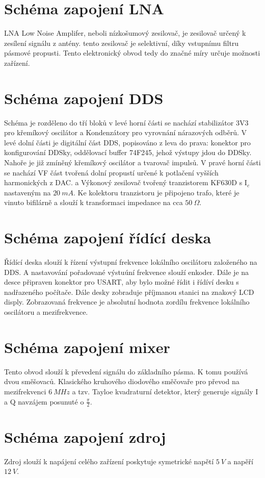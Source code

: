 \section{Schéma zapojení LNA}
	LNA Low Noise Amplifer, neboli nízkošumový zesilovač, je zesilovač určený k zesílení signálu z antény. tento zesilovač je selektivní, díky vstupnímu filtru pásmové propusti. Tento elektronický obvod tedy do značné míry určuje možnosti zařízení.
	
	
\section{Schéma zapojení DDS}
	Schéma je rozděleno do tří bloků v levé horní části se nachází stabilizátor 3V3 pro křemíkový oscilátor a Kondenzátory pro vyrovnání nárazových odběrů. V levé dolní části je digitální část DDS, popisováno z leva do prava: konektor pro konfigurování DDSky, oddělovací buffer 74F245, jehož výstupy jdou do DDSky. Nahoře je již zmíněný křemíkový oscilátor a tvarovač impulsů. V pravé horní části se nachází VF část tvořená dolní propustí určené k potlačení vyšších harmonických z DAC. a Výkonový zesilovač tvořený tranzistorem KF630D s I$_c$ nastaveným na $20~mA$. Ke kolektoru tranzistoru je připojeno trafo, které je vinuto bifilárně a slouží k transformaci impedance na cca $50~\Omega$.
	
	
\section{Schéma zapojení řídící deska}
	Řídící deska slouží k řízení výstupní frekvence lokálního oscilátoru založeného na DDS. A nastavování pořadované výstuúní frekvence slouží enkoder. Dále je na desce připraven konektor pro USART, aby bylo možné řídit i řídíví desku s nadřazeného počítače. Dále desky zobraduje příjmanou stanici na znakový LCD disply. Zobrazovaná frekvence je absolutní hodnota zordílu frekvence lokálního oscilátoru a mezifrekvence.
	
	
\section{Schéma zapojení mixer}
	Tento obvod slouží k převedení signálu do základního pásma. K tomu používá dvou směšovaců. Klasického kruhového diodového směčovaře pro převod na mezifrekvenci $6~MHz$ a tzv. Tayloe kvadraturní detektor, který generuje signály I a Q navzájem posunuté o $\frac{\pi}{2}$.
	
	
\section{Schéma zapojení zdroj}
	Zdroj slouží k napájení celého zařízení poskytuje symetrické napětí $5~V$ a napěří $12~V$.
	
